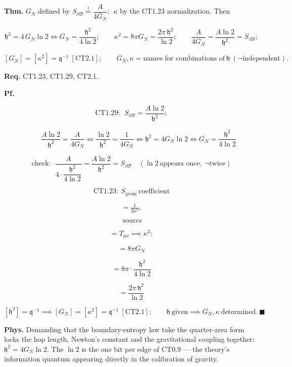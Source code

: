 \begin{theorem}\label{tag:CT2-9}
\textbf{Thm.} $G_N$ defined by $S_{\partial\mathcal B}\overset!=\dfrac{A}{4G_N}$; $\ \kappa$ by the CT1.23 normalization. Then

\[
\mathfrak h^2=4\,G_N\ln2\iff G_N=\frac{\mathfrak h^2}{4\ln2};\qquad
\kappa^2=8\pi G_N=\frac{2\pi\,\mathfrak h^2}{\ln2};\qquad
\frac{A}{4G_N}=\frac{A\ln2}{\mathfrak h^2}=S_{\partial\mathcal B};
\]

\[
[G_N]=[\kappa^2]=\mathfrak q^{-1}\ [\mathrm{CT2.1}];\qquad G_N,\kappa=\text{names for combinations of}\ \mathfrak h\ (\neg\text{independent}).
\]

\textbf{Req.} CT1.23, CT1.29, CT2.1.

\textbf{Pf.}

\[
\mathrm{CT1.29}:\ \ S_{\partial\mathcal B}=\frac{A\ln2}{\mathfrak h^2};
\]

\[
\qquad \frac{A\ln2}{\mathfrak h^2}=\frac{A}{4G_N}\iff\frac{\ln2}{\mathfrak h^2}=\frac{1}{4G_N}\iff\mathfrak h^2=4G_N\ln2\iff G_N=\frac{\mathfrak h^2}{4\ln2}
\]

\[
\text{check}:\ \ \frac{A}{4\cdot\dfrac{\mathfrak h^2}{4\ln2}}=\frac{A\ln2}{\mathfrak h^2}=S_{\partial\mathcal B}\quad(\ln2\ \text{appears once},\ \neg\text{twice})
\]

\[
\mathrm{CT1.23}:\ S_{\mathrm{geom}}\ \text{coefficient}
\]

\[
= \tfrac{1}{2\kappa^2},
\]

\[
\ \text{source}
\]

\[
= T_{\mu\nu}\implies\kappa^2:
\]

\[
= 8\pi G_N
\]

\[
= 8\pi\cdot\frac{\mathfrak h^2}{4\ln2}
\]

\[
= \frac{2\pi\,\mathfrak h^2}{\ln2}
\]

\[
[\mathfrak h^2]=\mathfrak q^{-1}\implies[G_N]=[\kappa^2]=\mathfrak q^{-1}\ [\mathrm{CT2.1}];\qquad\mathfrak h\ \text{given}\implies G_N,\kappa\ \text{determined}.\ \blacksquare
\]

\textbf{Phys.} Demanding that the boundary-entropy law take the quarter-area form locks the hop length, Newton’s constant and the gravitational coupling together: $\mathfrak h^2=4G_N\ln2$. The $\ln2$ is the one bit per edge of CT0.9 — the theory’s information quantum appearing directly in the calibration of gravity.

\end{theorem}

